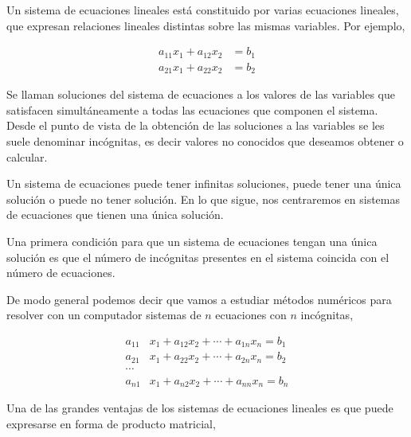 Un sistema de ecuaciones lineales está constituido por varias ecuaciones lineales, que expresan relaciones lineales distintas sobre las mismas variables. Por ejemplo,

\begin{align*}
a_{11}x_1+a_{12}x_2&=b_1\\
a_{21}x_1+a_{22}x_2&=b_2
\end{align*}

Se llaman soluciones del sistema de ecuaciones a los valores de las variables que satisfacen simultáneamente a todas las ecuaciones que componen el sistema. Desde el punto de vista de la obtención de las soluciones a las variables se les suele denominar incógnitas, es decir valores no conocidos que deseamos obtener o calcular.

Un sistema de ecuaciones puede tener infinitas soluciones, puede tener una única solución o puede no tener solución. En lo que sigue, nos centraremos en sistemas de ecuaciones que tienen una única solución. 

Una primera condición para que un sistema de ecuaciones tengan una única solución es que el número de incógnitas presentes en el sistema coincida con el número de ecuaciones. 

De modo general podemos decir que vamos a estudiar métodos numéricos para resolver con un computador sistemas de $n$ ecuaciones con $n$ incógnitas,

\begin{align*}
a_{11}&x_1+a_{12}x_2+\cdots +a_{1n}x_n=b_1\\
a_{21}&x_1+a_{22}x_2+\cdots +a_{2n}x_n=b_2\\
\cdots & \\
a_{n1}&x_1+a_{n2}x_2+\cdots +a_{nn}x_n=b_n
\end{align*}  

Una de las grandes ventajas de los sistemas de ecuaciones lineales es que puede expresarse en forma de producto matricial,


